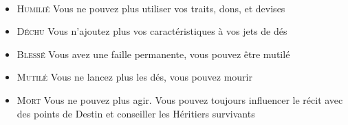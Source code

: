 \documentclass[12pt,twoside,a5paper]{article}
\begin{document}
~\\

\begin{minipage}[h]{0.05\textwidth}  \end{minipage} \hfill \begin{minipage}[h]{0.95\textwidth}
	\begin{itemize}
		\item[\Ovalbox{~}] \textsc{Humilié} Vous ne pouvez plus utiliser vos traits, dons, et devises
		\item[\Ovalbox{~}] \textsc{Déchu} Vous n'ajoutez plus vos caractéristiques à vos jets de dés
		\item[\Ovalbox{~}] \textsc{Blessé} Vous avez une faille permanente, vous pouvez être mutilé
		\item[\Ovalbox{~}] \textsc{Mutilé} Vous ne lancez plus les dés, vous pouvez mourir
		\item[\Ovalbox{~}] \textsc{Mort} Vous ne pouvez plus agir. Vous pouvez toujours influencer le récit avec des points de Destin et conseiller les Héritiers survivants 
	\end{itemize}
\end{minipage}

\end{document}
